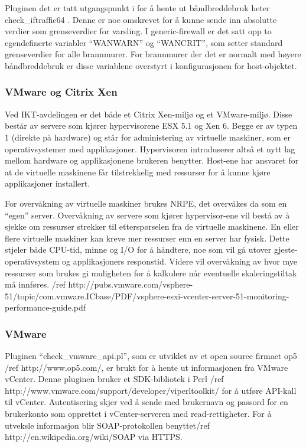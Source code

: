 Pluginen det er tatt utgangspunkt i for å hente ut båndbreddebruk heter check\_iftraffic64 . Denne er noe omskrevet for å kunne sende inn absolutte verdier som grenseverdier for varsling. I generic-firewall er det satt opp to egendefinerte variabler “WANWARN” og “WANCRIT”, som setter standard grenseverdier for alle brannmurer. For brannmurer der det er normalt med høyere båndbreddebruk er disse variablene overstyrt i konfigurasjonen for host-objektet.

\subsubsection{VMware og Citrix Xen}


Ved IKT-avdelingen er det både et Citrix Xen-miljø og et VMware-miljø. Disse består av servere som kjører hypervisorene ESX 5.1 og Xen 6. Begge er av typen 1 (direkte på hardware) og står for administering av virtuelle maskiner, som er operativsystemer med applikasjoner. Hypervisoren introduserer altså  et nytt lag mellom hardware og applikasjonene brukeren benytter. Host-ene har ansvaret for at de virtuelle maskinene får tilstrekkelig med ressurser for å kunne kjøre applikasjoner installert. 

For overvåkning av virtuelle maskiner brukes NRPE, det overvåkes da som en “egen” server. Overvåkning av servere som kjører hypervisor-ene vil bestå av å sjekke om ressurser strekker til etterspørselen fra de virtuelle maskinene. En eller flere virtuelle maskiner kan kreve mer ressurser enn en server har fysisk. Dette stjeler både CPU-tid, minne og I/O for å håndtere, noe som vil gå utover gjeste-operativsystem og applikasjoners responstid. Videre vil overvåkning av hvor mye ressurser som brukes gi muligheten for å kalkulere når eventuelle skaleringstiltak må innføres. /ref http://pubs.vmware.com/vsphere-51/topic/com.vmware.ICbase/PDF/vsphere-esxi-vcenter-server-51-monitoring-performance-guide.pdf

\subsubsection{VMware}

Pluginen “check\_vmware\_api.pl”, som er utviklet av et open source firmaet op5 /ref http://www.op5.com/, er brukt for å hente ut informasjonen fra VMware vCenter. Denne pluginen bruker et SDK-bibliotek i Perl /ref http://www.vmware.com/support/developer/viperltoolkit/ for å utføre API-kall til vCenter. Autentisering skjer ved å sende med brukernavn og passord for en brukerkonto som opprettet i vCenter-serveren med read-rettigheter. For å utveksle informasjon blir SOAP-protokollen benyttet/ref http://en.wikipedia.org/wiki/SOAP via HTTPS. 

